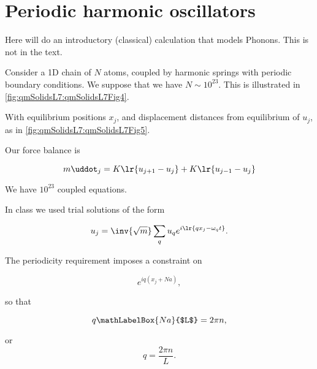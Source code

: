 %
%
\section{Periodic harmonic oscillators}

Here will do an introductory (classical) calculation that models Phonons.  This is not in the text.  

Consider a 1D chain of $N$ atoms, coupled by harmonic springs with periodic boundary conditions.  We suppose that we have $N \sim 10^{23}$.  This is illustrated in \cref{fig:qmSolidsL7:qmSolidsL7Fig4}.


With equilibrium positions $x_j$, and displacement distances from equilibrium of $u_j$, as in \cref{fig:qmSolidsL7:qmSolidsL7Fig5}.


Our force balance is

\begin{dmath}\label{eqn:condensedMatterLecture7:180}
m \uddot_j = K \lr{ u_{j + 1} - u_j } + K \lr{ u_{j - 1} - u_j} 
\end{dmath}

We have $10^{23}$ coupled equations.

In class we used trial solutions of the form

\begin{dmath}\label{eqn:condensedMatterLecture7:200}
u_j = \inv{\sqrt{m}} \sum_q u_q e^{i \lr{ q x_j - \omega_q t} }.
\end{dmath}

The periodicity requirement imposes a constraint on

\begin{dmath}\label{eqn:condensedMatterLecture7:220}
e^{i q( x_j + N a) },
\end{dmath}

so that 

\begin{dmath}\label{eqn:condensedMatterLecture7:240}
q \mathLabelBox{N a}{$L$} = 2 \pi n,
\end{dmath}

or
\begin{dmath}\label{eqn:condensedMatterLecture7:260}
q = \frac{2 \pi n}{L}.
\end{dmath}

